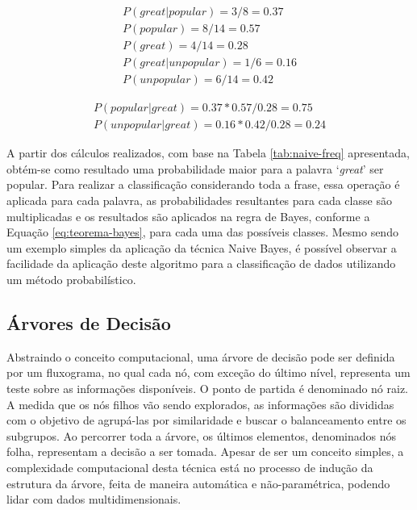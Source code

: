 \documentclass[oneside,openright,12pt]{ufsm_2015} %
\begin{document}
    \begin{align}
    P(great|popular) = 3/8 = 0.37 \\
    P(popular) = 8/14 = 0.57 \\
    P(great) = 4/14 = 0.28 \\
    P(great|unpopular) = 1/6 = 0.16 \\
    P(unpopular) = 6/14 = 0.42
    \end{align}
    
    \begin{align}
    P(popular|great) = 0.37 * 0.57 / 0.28 = 0.75 \\
    P(unpopular|great) = 0.16 * 0.42 / 0.28 = 0.24
    \end{align}
    
    \par A partir dos cálculos realizados, com base na Tabela \ref{tab:naive-freq} apresentada, obtém-se como resultado uma probabilidade maior para a palavra `\textit{great}' ser popular. Para realizar a classificação considerando toda a frase, essa operação é aplicada para cada palavra, as probabilidades resultantes para cada classe são multiplicadas e os resultados são aplicados na regra de Bayes, conforme a Equação \ref{eq:teorema-bayes}, para cada uma das possíveis classes. Mesmo sendo um exemplo simples da aplicação da técnica Naive Bayes, é possível observar a facilidade da aplicação deste algoritmo para a classificação de dados utilizando um método probabilístico.


\subsection{Árvores de Decisão}
\label{sec:fund-arvores-decisao}

    \par Abstraindo o conceito computacional, uma árvore de decisão pode ser definida por um fluxograma, no qual cada nó, com exceção do último nível, representa um teste sobre as informações disponíveis. O ponto de partida é denominado nó raiz. A medida que os nós filhos vão sendo explorados, as informações são divididas com o objetivo de agrupá-las por similaridade e buscar o balanceamento entre os subgrupos. Ao percorrer toda a árvore, os últimos elementos, denominados nós folha, representam a decisão a ser tomada. Apesar de ser um conceito simples, a complexidade computacional desta técnica está no processo de indução da estrutura da árvore, feita de maneira automática e não-paramétrica, podendo lidar com dados multidimensionais. 
    
\end{document}
